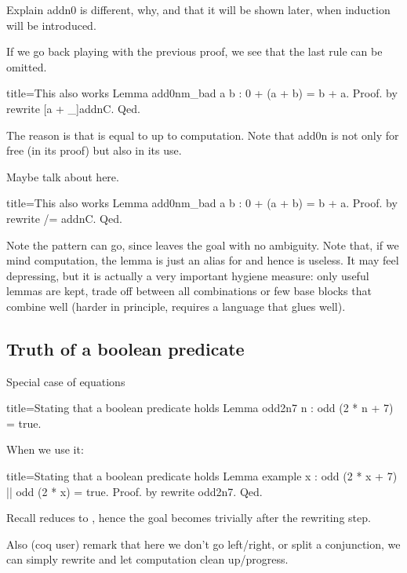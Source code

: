 Explain addn0 is different, why, and that it will be shown later,
when induction will be introduced.

If we go back playing with the previous proof, we see that the
last rule can be omitted.

\begin{coq}{title=This also works}
Lemma add0nm_bad a b : 0 + (a + b) = b + a.
Proof. by rewrite [a + _]addnC. Qed.
\end{coq}

The reason is that  is equal
to  up to computation.
Note that add0n  is not only for free (in its proof) but
also in its use.

Maybe talk about \C{/=} here.

\begin{coq}{title=This also works}
Lemma add0nm_bad a b : 0 + (a + b) = b + a.
Proof. by rewrite /= addnC. Qed.
\end{coq}

Note the pattern can go, since \C{/=} leaves the goal with
no ambiguity.
Note that, if we mind computation, the lemma is just an alias
for  and hence is useless.  It may feel depressing, but
it is actually a very important hygiene measure: only useful lemmas
are kept, trade off between all combinations or few base blocks that
combine well (harder in principle, requires a language that glues well).

\subsection{Truth of a boolean predicate}

Special case of equations

\begin{coq}{title=Stating that a boolean predicate holds}
Lemma odd2n7 n : odd (2 * n + 7) = true.
\end{coq}

When we use it:

\begin{coq}{title=Stating that a boolean predicate holds}
Lemma example x : odd (2 * x + 7) || odd (2 * x) = true.
Proof. by rewrite odd2n7. Qed.
\end{coq}

Recall  reduces to , hence the
goal becomes trivially  after the
rewriting step.

Also (coq user) remark that here we don't go left/right, or split
a conjunction, we can simply rewrite and let computation clean up/progress.

